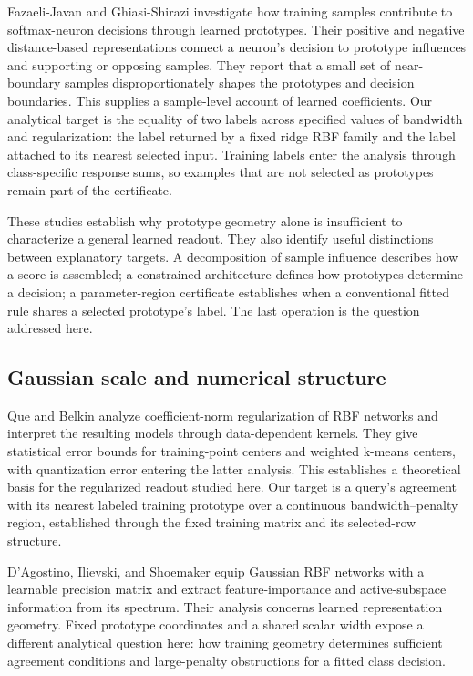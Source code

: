 \documentclass[preprint,12pt,authoryear]{elsarticle}
\begin{document}
Fazaeli-Javan and Ghiasi-Shirazi \citeyearpar{fazaeli2026} investigate how training samples contribute to softmax-neuron decisions through learned prototypes. Their positive and negative distance-based representations connect a neuron's decision to prototype influences and supporting or opposing samples. They report that a small set of near-boundary samples disproportionately shapes the prototypes and decision boundaries. This supplies a sample-level account of learned coefficients. Our analytical target is the equality of two labels across specified values of bandwidth and regularization: the label returned by a fixed ridge RBF family and the label attached to its nearest selected input. Training labels enter the analysis through class-specific response sums, so examples that are not selected as prototypes remain part of the certificate.

These studies establish why prototype geometry alone is insufficient to characterize a general learned readout. They also identify useful distinctions between explanatory targets. A decomposition of sample influence describes how a score is assembled; a constrained architecture defines how prototypes determine a decision; a parameter-region certificate establishes when a conventional fitted rule shares a selected prototype's label. The last operation is the question addressed here.

\subsection{Gaussian scale and numerical structure}
Que and Belkin \citeyearpar{que2016} analyze coefficient-norm regularization of RBF networks and interpret the resulting models through data-dependent kernels. They give statistical error bounds for training-point centers and weighted k-means centers, with quantization error entering the latter analysis. This establishes a theoretical basis for the regularized readout studied here. Our target is a query's agreement with its nearest labeled training prototype over a continuous bandwidth--penalty region, established through the fixed training matrix and its selected-row structure.

D'Agostino, Ilievski, and Shoemaker \citeyearpar{dagostino2024} equip Gaussian RBF networks with a learnable precision matrix and extract feature-importance and active-subspace information from its spectrum. Their analysis concerns learned representation geometry. Fixed prototype coordinates and a shared scalar width expose a different analytical question here: how training geometry determines sufficient agreement conditions and large-penalty obstructions for a fitted class decision.
\end{document}
